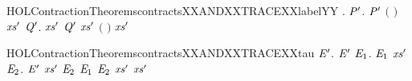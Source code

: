 \newcommand{\HOLContractionTheoremscontractsXXANDXXTRACEXXlabel}{\UseVerbatim{HOLContractionTheoremscontractsXXANDXXTRACEXXlabel}}
\begin{SaveVerbatim}{HOLContractionTheoremscontractsXXANDXXTRACEXXlabelYY}
\HOLTokenTurnstile{} \HOLSymConst{\HOLTokenForall{}} .
          \HOLSymConst{\HOLTokenImp{}}
       \HOLSymConst{\HOLTokenForall{}}  \ensuremath{\HOLBoundVar{P}\sp{\prime}}.
              \ensuremath{\HOLBoundVar{P}\sp{\prime}} \HOLSymConst{\HOLTokenConj{}}  \ensuremath{(} \ensuremath{)}  \HOLSymConst{\HOLTokenImp{}}
           \HOLSymConst{\HOLTokenExists{}}\ensuremath{\HOLBoundVar{xs}\sp{\prime}} \ensuremath{\HOLBoundVar{Q}\sp{\prime}}.
                 \ensuremath{\HOLBoundVar{xs}\sp{\prime}} \ensuremath{\HOLBoundVar{Q}\sp{\prime}} \HOLSymConst{\HOLTokenConj{}}    \HOLSymConst{\HOLTokenConj{}}
                \ensuremath{\HOLBoundVar{xs}\sp{\prime}} \HOLSymConst{\HOLTokenLeq{}}   \HOLSymConst{\HOLTokenConj{}}
                \ensuremath{(} \ensuremath{)} \ensuremath{\HOLBoundVar{xs}\sp{\prime}}
\end{SaveVerbatim}
\newcommand{\HOLContractionTheoremscontractsXXANDXXTRACEXXlabelYY}{\UseVerbatim{HOLContractionTheoremscontractsXXANDXXTRACEXXlabelYY}}
\begin{SaveVerbatim}{HOLContractionTheoremscontractsXXANDXXTRACEXXtau}
\HOLTokenTurnstile{} \HOLSymConst{\HOLTokenForall{}} \ensuremath{\HOLBoundVar{E}\sp{\prime}}.
         \ensuremath{\HOLBoundVar{E}\sp{\prime}} \HOLSymConst{\HOLTokenImp{}}
       \HOLSymConst{\HOLTokenForall{}} \ensuremath{\HOLBoundVar{E}\sb{\mathrm{1}}}.
              \ensuremath{\HOLBoundVar{E}\sb{\mathrm{1}}} \HOLSymConst{\HOLTokenConj{}}   \HOLSymConst{\HOLTokenImp{}}
           \HOLSymConst{\HOLTokenExists{}}\ensuremath{\HOLBoundVar{xs}\sp{\prime}} \ensuremath{\HOLBoundVar{E}\sb{\mathrm{2}}}.
                \ensuremath{\HOLBoundVar{E}\sp{\prime}} \ensuremath{\HOLBoundVar{xs}\sp{\prime}} \ensuremath{\HOLBoundVar{E}\sb{\mathrm{2}}} \HOLSymConst{\HOLTokenConj{}} \ensuremath{\HOLBoundVar{E}\sb{\mathrm{1}}}  \ensuremath{\HOLBoundVar{E}\sb{\mathrm{2}}} \HOLSymConst{\HOLTokenConj{}}
                \ensuremath{\HOLBoundVar{xs}\sp{\prime}} \HOLSymConst{\HOLTokenLeq{}}   \HOLSymConst{\HOLTokenConj{}}  \ensuremath{\HOLBoundVar{xs}\sp{\prime}}
\end{SaveVerbatim}
